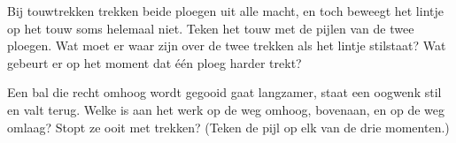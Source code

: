 \begin{exercise}[$\star\star$]\label{exo:g2:pushes-and-pulls:9}
Bij touwtrekken trekken beide ploegen uit alle macht, en toch beweegt
het lintje op het touw soms helemaal niet. Teken het touw met de
pijlen van de twee ploegen. Wat moet er waar zijn over de twee trekken
als het lintje stilstaat? Wat gebeurt er op het moment dat één ploeg
harder trekt?
\end{exercise}

\begin{exercise}[$\star\star$]\label{exo:g2:pushes-and-pulls:10}
Een bal die recht omhoog wordt gegooid gaat langzamer, staat een
oogwenk stil en valt terug. Welke  is aan het werk op de weg
omhoog, bovenaan, en op de weg omlaag? Stopt ze ooit met trekken?
(Teken de pijl op elk van de drie momenten.)
\end{exercise}
